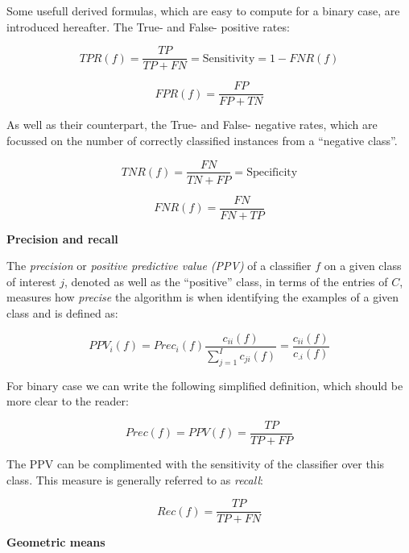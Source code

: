 \documentclass[11pt,]{article}
\begin{document}
Some usefull derived formulas, which are easy to compute for a binary
case, are introduced hereafter. The True- and False- positive rates:

\begin{equation}
TPR (f) = \frac{TP}{TP + FN} = \text{Sensitivity} = 1 - FNR (f)
\end{equation}

\begin{equation}
FPR (f) = \frac{FP}{FP + TN}
\end{equation}

As well as their counterpart, the True- and False- negative rates, which
are focussed on the number of correctly classified instances from a
``negative class''.

\begin{equation}
TNR (f) = \frac{FN}{TN + FP} = \text{Specificity}
\end{equation}

\begin{equation}
FNR (f) = \frac{FN}{FN + TP}
\end{equation}

\textbf{Precision and recall}

The \emph{precision} or \emph{positive predictive value (PPV)} of a
classifier \(f\) on a given class of interest \(j\), denoted as well as
the ``positive'' class, in terms of the entries of \(C\), measures how
\emph{precise} the algorithm is when identifying the examples of a given
class and is defined as:

\begin{equation}
PPV_i (f) = Prec_i (f) \frac{c_{ii} (f)}{\sum_{j = 1}^{I} c_{ji} (f)} = \frac{c_{ii} (f)}{c_{.i} (f)}
\end{equation}

For binary case we can write the following simplified definition, which
should be more clear to the reader:

\begin{equation}
Prec (f) = PPV (f) = \frac{TP}{TP + FP}
\end{equation}

The PPV can be complimented with the sensitivity of the classifier over
this class. This measure is generally referred to as \emph{recall}:

\begin{equation}
Rec (f) = \frac{TP}{TP + FN}
\end{equation}

\textbf{Geometric means}
\end{document}
